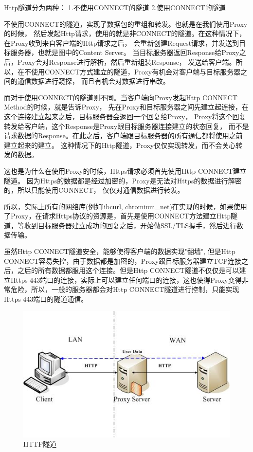 \documentclass{book}
\begin{document}
Http隧道分为两种：
1.不使用CONNECT的隧道
2.使用CONNECT的隧道

不使用CONNECT的隧道，实现了数据包的重组和转发。也就是在我们使用Proxy的时候，
然后发起Http请求，使用的就是非CONNECT的隧道。在这种情况下，在Proxy收到来自客户端的Http请求之后，
会重新创建Request请求，并发送到目标服务器，也就是图中的Content Server。
当目标服务器返回Response给Proxy之后，Proxy会对Response进行解析，然后重新组装Response，
发送给客户端。所以，在不使用CONNECT方式建立的隧道，Proxy有机会对客户端与目标服务器之间的通信数据进行窥探，
而且有机会对数据进行串改。

而对于使用CONNECT的隧道则不同。当客户端向Proxy发起Http CONNECT Method的时候，就是告诉Proxy，
先在Proxy和目标服务器之间先建立起连接，在这个连接建立起来之后，目标服务器会返回一个回复给Proxy，
Proxy将这个回复转发给客户端，这个Response是Proxy跟目标服务器连接建立的状态回复，
而不是请求数据的Response。在此之后，客户端跟目标服务器的所有通信都将使用之前建立起来的建立。
这种情况下的Http隧道，Proxy仅仅实现转发，而不会关心转发的数据。

这也是为什么在使用Proxy的时候，Https请求必须首先使用Http CONNECT建立隧道。
因为Https的数据都是经过加密的，Proxy是无法对Https的数据进行解密的，所以只能使用CONNECT，
仅仅对通信数据进行转发。

所以，实际上所有的网络库(例如libcurl, chromium\_net)在实现的时候，如果使用了Proxy，在请求Https协议的资源是，首先是使用CONNECT方法建立Http隧道，等收到目标服务器建立成功的回复之后，开始做SSL/TLS握手，然后进行数据传输。

虽然Http CONNECT隧道安全，能够使得客户端的数据实现"翻墙", 但是Http CONNECT容易失控，由于数据都是加密的，Proxy跟目标服务器建立TCP连接之后，之后的所有数据都服用这个连接。但是Http CONNECT隧道不仅仅是可以建立Https 443端口的连接，实际上可以建立任何端口的连接，这也使得Proxy变得非常危险，所以，一般的服务器都会对Http CONNECT隧道进行控制，只能实现Https 443端口的隧道通信。

\begin{figure}[htbp]
	\centering
	\includegraphics[scale=0.8]{HttpTunnel.jpg}
	\caption{HTTP隧道}
	\label{fig:HttpTunnel}
\end{figure}
\end{document}
